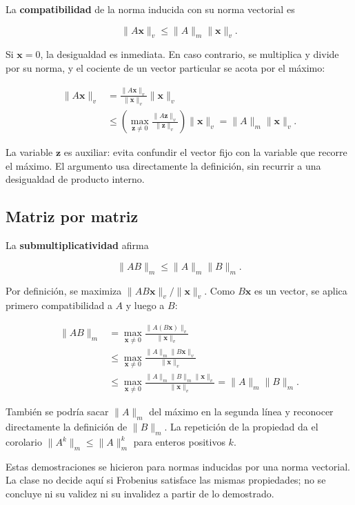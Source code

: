 \documentclass[12pt,a4paper]{article}
\begin{document}
La \textbf{compatibilidad} de la norma inducida con su norma vectorial es

\[
\boxed{\|A\mathbf x\|_v\le\|A\|_m\|\mathbf x\|_v}.
\]

Si $\mathbf x=0$, la desigualdad es inmediata. En caso contrario, se multiplica y divide por su norma, y el cociente de un vector particular se acota por el máximo:

\[
\begin{aligned}
\|A\mathbf x\|_v
&=\frac{\|A\mathbf x\|_v}{\|\mathbf x\|_v}\|\mathbf x\|_v\\
&\le\left(\max_{\mathbf z\ne0}
\frac{\|A\mathbf z\|_v}{\|\mathbf z\|_v}\right)\|\mathbf x\|_v
=\|A\|_m\|\mathbf x\|_v.
\end{aligned}
\]

La variable $\mathbf z$ es auxiliar: evita confundir el vector fijo con la variable que recorre el máximo. El argumento usa directamente la definición, sin recurrir a una desigualdad de producto interno.

\subsection{Matriz por matriz}

La \textbf{submultiplicatividad} afirma

\[
\boxed{\|AB\|_m\le\|A\|_m\|B\|_m}.
\]

Por definición, se maximiza $\|AB\mathbf x\|_v/\|\mathbf x\|_v$. Como $B\mathbf x$ es un vector, se aplica primero compatibilidad a $A$ y luego a $B$:

\[
\begin{aligned}
\|AB\|_m
&=\max_{\mathbf x\ne0}\frac{\|A(B\mathbf x)\|_v}{\|\mathbf x\|_v}\\
&\le\max_{\mathbf x\ne0}
\frac{\|A\|_m\|B\mathbf x\|_v}{\|\mathbf x\|_v}\\
&\le\max_{\mathbf x\ne0}
\frac{\|A\|_m\|B\|_m\|\mathbf x\|_v}{\|\mathbf x\|_v}
=\|A\|_m\|B\|_m.
\end{aligned}
\]

También se podría sacar $\|A\|_m$ del máximo en la segunda línea y reconocer directamente la definición de $\|B\|_m$. La repetición de la propiedad da el corolario $\|A^k\|_m\le\|A\|_m^k$ para enteros positivos $k$.

\begin{notebox}
Estas demostraciones se hicieron para normas inducidas por una norma vectorial. La clase no decide aquí si Frobenius satisface las mismas propiedades; no se concluye ni su validez ni su invalidez a partir de lo demostrado.
\end{notebox}
\end{document}
